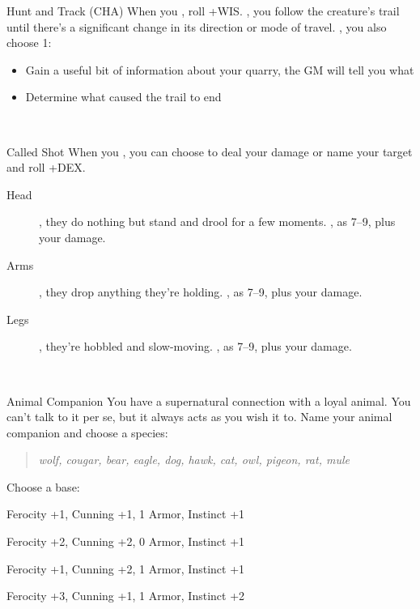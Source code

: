 \documentclass[8pt]{extarticle}
\begin{document}
\begin{minipage}[t]{4.6in}



\begin{basicmove}{Hunt and Track (CHA)}
  When you , roll +WIS. \onHit, you follow the creature's
  trail until there's a significant change in its direction or mode of
  travel. \onSuccess, you also choose 1:
  \begin{itemize}
  \item Gain a useful bit of information about your quarry, the GM
    will tell you what
  \item Determine what caused the trail to end
  \end{itemize}
\end{basicmove}
\

\begin{basicmove}{Called Shot}
  When you ,
  you can choose to deal your damage or name your target and roll
  +DEX.

  \begin{description}
  \item[Head] \onPartial, they do nothing but stand and drool for a
    few moments. \onSuccess, as 7--9, plus your damage.
  \item[Arms] \onPartial, they drop anything they're
    holding. \onSuccess, as 7--9, plus your damage.
  \item[Legs] \onPartial, they're hobbled and slow-moving. \onSuccess,
    as 7--9, plus your damage.
  \end{description}
\end{basicmove}
\

\begin{basicmove}{Animal Companion}
  You have a supernatural connection with a loyal animal. You can't
  talk to it per se, but it always acts as you wish it to. Name your
  animal companion and choose a species:

  \begin{quote}
    \textit{wolf, cougar, bear, eagle, dog, hawk, cat, owl, pigeon,
      rat, mule}
  \end{quote}

  Choose a base:
  \begin{choices}
  \item Ferocity +1, Cunning +1, 1 Armor, Instinct +1
  \item Ferocity +2, Cunning +2, 0 Armor, Instinct +1
  \item Ferocity +1, Cunning +2, 1 Armor, Instinct +1
  \item Ferocity +3, Cunning +1, 1 Armor, Instinct +2
  \end{choices}


\end{basicmove}
\end{minipage}
\end{document}
